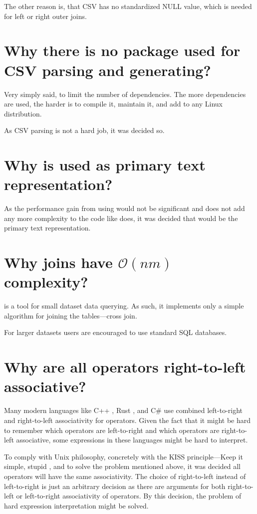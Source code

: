 The other reason is, that CSV has no standardized NULL value, which is needed for left or right outer joins.

\section{Why there is no package used for CSV parsing and generating?}
Very simply said, to limit the number of dependencies. The more dependencies are used, the harder is to compile it, maintain it, and add to any Linux distribution.

As CSV parsing is not a hard job, it was decided so.

\section{Why  is used as primary text representation?}
As the performance gain from using  would not be significant and  does not add any more complexity to the code like  does, 
it was decided that  would be the primary text representation.

\section{Why joins have $\mathcal{O}(nm)$ complexity?}
 is a tool for small dataset data querying. As such, it implements only a simple algorithm for joining the tables---cross join.

For larger datasets users are encouraged to use standard SQL databases.

\section{Why are all operators right-to-left associative?}
Many modern languages like C++ \cite{cpp-associativity-manual}, Rust \cite{rust-expressions}, and C\# \cite{csharp-expressions} use combined left-to-right and right-to-left associativity for operators.
Given the fact that it might be hard to remember which operators are left-to-right and which operators are right-to-left associative, some expressions in these languages might be hard to interpret.

To comply with Unix philosophy, concretely with the KISS principle---Keep it simple, stupid \cite{enwiki-kiss}, and to solve the problem mentioned above, it was decided all operators will have the same associativity.
The choice of right-to-left instead of left-to-right is just an arbitrary decision as there are arguments for both right-to-left or left-to-right associativity of operators.
By this decision, the problem of hard expression interpretation might be solved.
